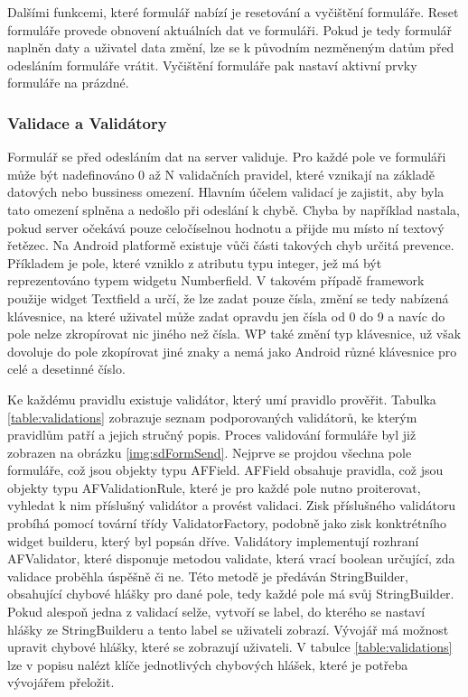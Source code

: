 Dalšími funkcemi, které formulář nabízí je resetování a vyčištění formuláře. Reset formuláře provede obnovení aktuálních dat ve formuláři. Pokud je tedy formulář naplněn daty a uživatel data změní, lze se k původním nezměneným datům před odesláním formuláře vrátit. Vyčištění formuláře pak nastaví aktivní prvky formuláře na prázdné.

\subsubsection{Validace a Validátory}
Formulář se před odesláním dat na server validuje. Pro každé pole ve formuláři může být nadefinováno 0 až N validačních pravidel, které vznikají na základě datových nebo bussiness omezení. Hlavním účelem validací je zajistit, aby byla tato omezení splněna a nedošlo při odeslání k chybě. Chyba by například nastala, pokud server očekává pouze celočíselnou hodnotu a přijde mu místo ní textový řetězec. Na Android platformě existuje vůči části takových chyb určitá prevence. Příkladem je pole, které vzniklo z atributu typu integer, jež má být reprezentováno typem widgetu Numberfield. V takovém případě framework použije widget Textfield a určí, že lze zadat pouze čísla, změní se tedy nabízená klávesnice, na které uživatel může zadat opravdu jen čísla od 0 do 9 a navíc do pole nelze zkropírovat nic jiného než čísla. WP také změní typ klávesnice, už však dovoluje do pole zkopírovat jiné znaky a nemá jako Android různé klávesnice pro celé a desetinné číslo.

Ke každému pravidlu existuje validátor, který umí pravidlo prověřit. Tabulka \ref{table:validations} zobrazuje seznam podporovaných validátorů, ke kterým pravidlům patří a jejich stručný popis. Proces validování formuláře byl již zobrazen na obrázku \ref{img:sdFormSend}. Nejprve se projdou všechna pole formuláře, což jsou objekty typu AFField. AFField obsahuje pravidla, což jsou objekty typu AFValidationRule, které je pro každé pole nutno proiterovat, vyhledat k nim příslušný validátor a provést validaci. Zisk příslušného validátoru probíhá pomocí tovární třídy ValidatorFactory, podobně jako zisk konktrétního widget builderu, který byl popsán dříve. Validátory implementují rozhraní AFValidator, které disponuje metodou validate, která vrací boolean určující, zda validace proběhla úspěšně či ne. Této metodě je předáván StringBuilder, obsahující chybové hlášky pro dané pole, tedy každé pole má svůj StringBuilder. Pokud alespoň jedna z validací selže, vytvoří se label, do kterého se nastaví hlášky ze StringBuilderu a tento label se uživateli zobrazí. Vývojář má možnost upravit chybové hlášky, které se zobrazují uživateli. V tabulce \ref{table:validations} lze v popisu nalézt klíče jednotlivých chybových hlášek, které je potřeba vývojářem přeložit.

